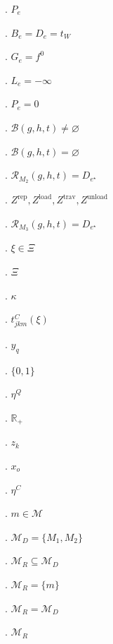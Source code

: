 \documentclass[a4paper,11pt]{article}
\begin{document}
. \(P_e\)\par\smallskip
{}. \(B_e=D_e=t_W\)\par\smallskip
{}. \(G_e=f^0\)\par\smallskip
{}. \(L_e=-\infty\)\par\smallskip
{}. \(P_e=0\)\par\smallskip
{}. \(\mathcal B(g,h,t)\neq\varnothing\)\par\smallskip
{}. \(\mathcal B(g,h,t)=\varnothing\)\par\smallskip
{}. \(\mathcal R_{M_2}(g,h,t)=D_{e^\star}\)\par\smallskip
{}. \(Z^{\mathrm{rep}},Z^{\mathrm{load}},Z^{\mathrm{trav}},Z^{\mathrm{unload}}\)\par\smallskip
{}. \(\mathcal R_{M_3}(g,h,t)=D_{e^\star}\)\par\smallskip
{}. \(\xi\in\Xi\)\par\smallskip
{}. \(\Xi\)\par\smallskip
{}. \(\kappa\)\par\smallskip
{}. \(t^C_{jkm}(\xi)\)\par\smallskip
{}. \(y_q\)\par\smallskip
{}. \(\{0,1\}\)\par\smallskip
{}. \(\eta^Q\)\par\smallskip
{}. \(\mathbb R_+\)\par\smallskip
{}. \(z_k\)\par\smallskip
{}. \(x_o\)\par\smallskip
{}. \(\eta^C\)\par\smallskip
{}. \(m\in\mathcal M\)\par\smallskip
{}. \(\mathcal M_D=\{M_1,M_2\}\)\par\smallskip
{}. \(\mathcal M_R\subseteq\mathcal M_D\)\par\smallskip
{}. \(\mathcal M_R=\{m\}\)\par\smallskip
{}. \(\mathcal M_R=\mathcal M_D\)\par\smallskip
{}. \(\mathcal M_R\)\par\smallskip
\end{document}

